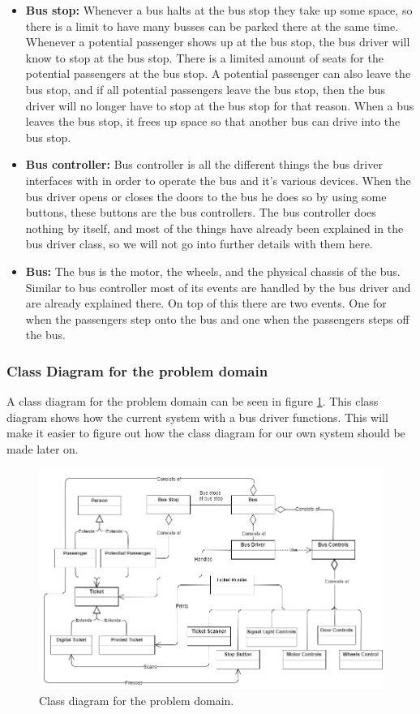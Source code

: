 \begin{itemize}
\item \textbf{Bus stop:}
Whenever a bus halts at the bus stop they take up some space, so there is a limit to have many busses can be parked there at the same time. Whenever a potential passenger shows up at the bus stop, the bus driver will know to stop at the bus stop. There is a limited amount of seats for the potential passengers at the bus stop. A potential passenger can also leave the bus stop, and if all potential passengers leave the bus stop, then the bus driver will no longer have to stop at the bus stop for that reason. When a bus leaves the bus stop, it frees up space so that another bus can drive into the bus stop.
\item \textbf{Bus controller:}
Bus controller is all the different things the bus driver interfaces with in order to operate the bus and it's various devices. When the bus driver opens or closes the doors to the bus he does so by using some buttons, these buttons are the bus controllers. The bus controller does nothing by itself, and most of the things have already been explained in the bus driver class, so we will not go into further details with them here.
\item \textbf{Bus:}
The bus is the motor, the wheels, and the physical chassis of the bus. Similar to bus controller most of its events are handled by the bus driver and are already explained there. On top of this there are two events. One for when the passengers step onto the bus and one when the passengers steps off the bus.
\end{itemize}


\subsubsection{Class Diagram for the problem domain}

A class diagram for the problem domain can be seen in figure \ref{problem-domain-class-diagram}. This class diagram shows how the current system with a bus driver functions. This will make it easier to figure out how the class diagram for our own system should be made later on.

\begin{figure}[H]
\centering
\includegraphics[scale=0.49]{Images/problem_domain_class_diagram.png}
\caption{Class diagram for the problem domain.}
\label{problem-domain-class-diagram}
\end{figure}

